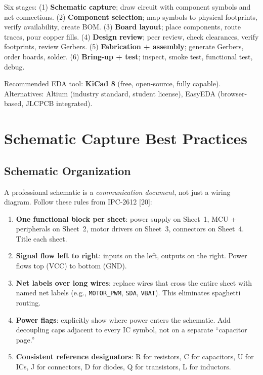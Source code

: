 Six stages: (1) \textbf{Schematic capture}; draw circuit with component symbols and net connections. (2) \textbf{Component selection}; map symbols to physical footprints, verify availability, create BOM. (3) \textbf{Board layout}; place components, route traces, pour copper fills. (4) \textbf{Design review}; peer review, check clearances, verify footprints, review Gerbers. (5) \textbf{Fabrication + assembly}; generate Gerbers, order boards, solder. (6) \textbf{Bring-up + test}; inspect, smoke test, functional test, debug.

Recommended EDA tool: \textbf{KiCad 8} (free, open-source, fully capable). Alternatives: Altium (industry standard, student license), EasyEDA (browser-based, JLCPCB integrated).


\section{Schematic Capture Best Practices}

\subsection{Schematic Organization}
A professional schematic is a \emph{communication document}, not just a wiring diagram. Follow these rules from IPC-2612 [20]:
\begin{enumerate}[nosep,leftmargin=1.5em]
\item \textbf{One functional block per sheet}: power supply on Sheet~1, MCU + peripherals on Sheet~2, motor drivers on Sheet~3, connectors on Sheet~4. Title each sheet.
\item \textbf{Signal flow left to right}: inputs on the left, outputs on the right. Power flows top (VCC) to bottom (GND).
\item \textbf{Net labels over long wires}: replace wires that cross the entire sheet with named net labels (e.g., \texttt{MOTOR\_PWM}, \texttt{SDA}, \texttt{VBAT}). This eliminates spaghetti routing.
\item \textbf{Power flags}: explicitly show where power enters the schematic. Add decoupling caps adjacent to every IC symbol, not on a separate ``capacitor page.''
\item \textbf{Consistent reference designators}: R for resistors, C for capacitors, U for ICs, J for connectors, D for diodes, Q for transistors, L for inductors.
\end{enumerate}

